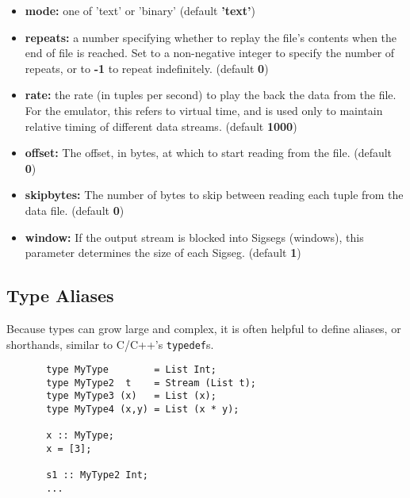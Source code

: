 \documentclass[twocolumn]{report}
\begin{document}
\begin{itemize}
\item {\bf mode:} one of 'text' or 'binary' (default {\bf 'text'})

\item {\bf repeats:} a number specifying whether to replay the file's
  contents when the end of file is reached.  Set to a non-negative
  integer to specify the number of repeats, or to {\bf -1} to repeat
  indefinitely.  (default {\bf 0})

\item {\bf rate:} the rate (in tuples per second) to play the back the
  data from the file.  For the emulator, this refers to virtual time,
  and is used only to maintain relative timing of different data
  streams.  (default {\bf 1000})

\item {\bf offset:}
  The offset, in bytes, at which to start reading from the
  file. (default {\bf 0})

\item {\bf skipbytes:}
The number of bytes to skip between reading each tuple
  from the data file. (default {\bf 0})

\item {\bf window:} If the output stream is blocked into Sigsegs
  (windows), this parameter determines the size of each
  Sigseg. (default {\bf 1})

\end{itemize}





\subsection{Type Aliases}

Because types can grow large and complex, it is often helpful to
define aliases, or shorthands, similar to C/C++'s {\tt typedef}s.

\begin{center}
\begin{verbatim}
       type MyType        = List Int;
       type MyType2  t    = Stream (List t);
       type MyType3 (x)   = List (x);
       type MyType4 (x,y) = List (x * y);

       x :: MyType;
       x = [3];

       s1 :: MyType2 Int;
       ...
\end{verbatim}
\end{center}
\end{document}
